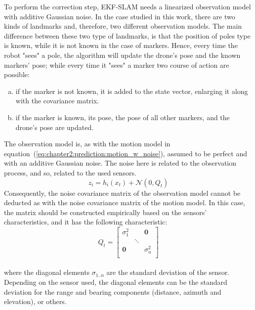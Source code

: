 To perform the correction step, EKF-SLAM needs a linearized observation model with additive Gaussian noise. In the case studied in this work, there are two kinds of landmarks and, therefore, two different observation models. The main difference between these two type of landmarks, is that the position of poles type is known, while it is not known in the case of markers. Hence, every time the robot "sees" a pole, the algorithm will update the drone's pose and the known markers' pose; while every time it "sees" a marker two course of action are possible:
\begin{enumerate}[a)]
    \item{if the marker is not known, it is added to the state vector, enlarging it along with the covariance matrix.}
    \item{if the marker is known, its pose, the pose of all other markers, and the drone's pose are updated.}
\end{enumerate}

The observation model is, as with the motion model in equation~(\ref{eq:chapter2:prediction:motion_w_noise}), assumed to be perfect and with an additive Gaussian noise. The noise here is related to the observation process, and so, related to the used sensors.
\begin{equation}
    z_i = h_i\left(x_t\right) + \mathcal{N}\left(0, Q_t\right)
    \label{eq:chapter2:correction:obs_w_noise}
\end{equation}
Consequently, the noise covariance matrix of the observation model cannot be deducted as with the noise covariance matrix of the motion model. In this case, the matrix should be constructed empirically based on the sensors' characteristics, and it has the following characteristic:
\begin{equation}
    Q_t = \begin{bmatrix}
        \sigma_1^2 &  & \textbf{0} \\
         & \ddots & \\
        \textbf{0} & & \sigma_n^2 \\
    \end{bmatrix}
\end{equation}\\
where the diagonal elements $\sigma_{1..n}$ are the standard deviation of the sensor. Depending on the sensor used, the diagonal elements can be the standard deviation for the range and bearing components (distance, azimuth and elevation), or others.\\

